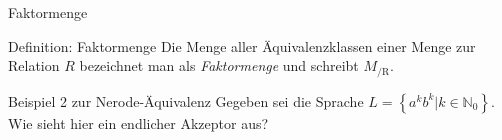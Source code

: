\begin{frame}{Faktormenge}
    \begin{block}{Definition: Faktormenge}
        Die Menge aller Äquivalenzklassen einer Menge zur Relation $R$ bezeichnet man als \emph{Faktormenge} und schreibt $M_\mathrm{/R}$.
    \end{block}
\end{frame}
\begin{frame}{Beispiel 2 zur Nerode-Äquivalenz}
    Gegeben sei die Sprache $L = \left\{ a^k b^k | k \in \mathbb{N}_0 \right\}$. \\
    Wie sieht hier ein endlicher Akzeptor aus?
    \\
    \\
    \\
\end{frame}


